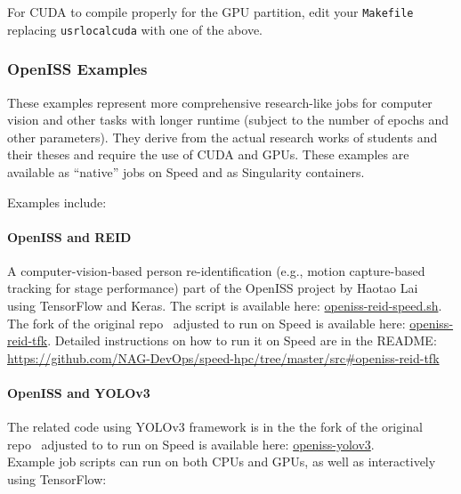\noindent For CUDA to compile properly for the GPU partition, edit your \texttt{Makefile}
replacing \texttt{\/usr\/local\/cuda} with one of the above.

\subsubsection{OpenISS Examples}
\label{sect:openiss-examples}

These examples represent more comprehensive research-like jobs
for computer vision and other tasks with longer runtime (subject to the number of epochs and other parameters).
They derive from the actual research works of students and their theses and require the use of CUDA and GPUs.
These examples are available as ``native'' jobs on Speed and as Singularity containers.

\noindent Examples include:
\paragraph{OpenISS and REID}
\label{sect:openiss-reid}

A computer-vision-based person re-identification 
(e.g., motion capture-based tracking for stage performance) part of the OpenISS
project by Haotao Lai~\cite{lai-haotao-mcthesis19} using TensorFlow and Keras.
The script is available here:
\href{https://github.com/NAG-DevOps/speed-hpc/blob/master/src/openiss-reid-speed.sh}{openiss-reid-speed.sh}.
The fork of the original repo~\cite{openiss-reid-tfk} adjusted to run on Speed is available here:
\href{https://github.com/NAG-DevOps/openiss-reid-tfk}{openiss-reid-tfk}.
Detailed instructions on how to run it on Speed are in the README:
\url{https://github.com/NAG-DevOps/speed-hpc/tree/master/src#openiss-reid-tfk}

\paragraph{OpenISS and YOLOv3}
\label{sect:openiss-yolov3}

The related code using YOLOv3 framework is in the
the fork of the original repo~\cite{openiss-yolov3} adjusted
to to run on Speed is available here: \href{https://github.com/NAG-DevOps/openiss-yolov3}{openiss-yolov3}.\\

\noindent Example job scripts can run on both CPUs and GPUs, as well as interactively using TensorFlow:


